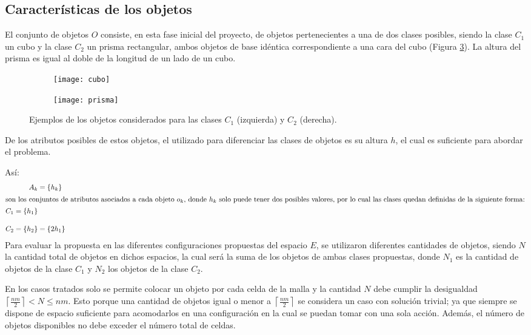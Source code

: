 \subsection{Características de los objetos}
\label{subsec:objetos}
%
%
El conjunto de objetos $O$ consiste, en esta fase inicial del proyecto, de objetos pertenecientes a una de dos clases posibles, siendo la clase $C_1$ un cubo y la clase $C_2$ un prisma rectangular, ambos objetos de base idéntica correspondiente a una cara del cubo (Figura \ref{fig:objetos}). 
La altura del prisma es igual al doble de la longitud de un lado de un cubo. 
%
\begin{figure}[H]
    \begin{subfigure}[b]{0.2\textwidth}
		\texttt{[image: cubo]}%
       	\label{subfig:cubo}%
    \end{subfigure}%
    \hspace{1.5cm}
    \begin{subfigure}[b]{0.2\textwidth}
       	\texttt{[image: prisma]}%
       	\label{subfig:prisma}%
    \end{subfigure}%
    \caption{Ejemplos de los objetos considerados para las clases $C_1$ (izquierda) y $C_2$ (derecha).}%
    \label{fig:objetos}%
\end{figure}
%
De los atributos posibles de estos objetos, el utilizado para diferenciar las clases de objetos es su altura $h$, el cual es suficiente para abordar el problema.

Así:
%
\begin{align}
	\label{eq:atributos_diferenciadores}
	A_k &= \{h_k\} \\
	\intertext{son los conjuntos de atributos asociados a cada objeto $o_k$, donde $h_k$ solo puede tener dos posibles valores, por lo cual las clases quedan definidas de la siguiente forma:}
	\begin{split}
		C_1  &= \{h_1\} \\[1em]
		C_2  &= \{h_2\} \rlap{${}= \{2h_1\}$}
	\end{split}
\end{align}
%
Para evaluar la propuesta en las diferentes configuraciones propuestas del espacio $E$, se utilizaron diferentes cantidades de objetos, siendo $N$ la cantidad total de objetos en dichos espacios, la cual será la suma de los objetos de ambas clases propuestas, donde $N_1$ es la cantidad de objetos de la clase $C_1$ y $N_2$ los objetos de la clase $C_2$. 

En los casos tratados solo se permite colocar un objeto por cada celda de la malla y la cantidad $N$ debe cumplir la desigualdad $\left\lceil \frac{nm}{2} \right\rceil < N \leq nm$.
Esto porque una cantidad de objetos igual o menor a $\left\lceil \frac{nm}{2} \right\rceil$ se considera un caso con solución trivial; ya que siempre se dispone de espacio suficiente para acomodarlos en una configuración en la cual se puedan tomar con una sola acción.
Además, el número de objetos disponibles no debe exceder el número total de celdas.
 

